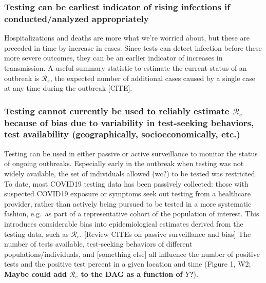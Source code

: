 \documentclass[]{article}
\begin{document}
\hypertarget{testing-can-be-earliest-indicator-of-rising-infections-if-conductedanalyzed-appropriately}{%
\subsubsection{Testing can be earliest indicator of rising infections if
conducted/analyzed
appropriately}\label{testing-can-be-earliest-indicator-of-rising-infections-if-conductedanalyzed-appropriately}}

Hospitalizations and deaths are more what we're worried about, but these
are preceded in time by increase in cases. Since tests can detect
infection before these more severe outcomes, they can be an earlier
indicator of increases in transmission. A useful summary statistic to
estimate the current status of an outbreak is \(\mathcal{R}_e\), the
expected number of additional cases caused by a single case at any time
during the outbreak {[}CITE{]}.

\hypertarget{testing-cannot-currently-be-used-to-reliably-estimate-mathcalr_e-because-of-bias-due-to-variability-in-test-seeking-behaviors-test-availability-geographically-socioeconomically-etc.}{%
\subsubsection{\texorpdfstring{Testing cannot currently be used to
reliably estimate \(\mathcal{R}_e\) because of bias due to variability
in test-seeking behaviors, test availability (geographically,
socioeconomically,
etc.)}{Testing cannot currently be used to reliably estimate \textbackslash mathcal\{R\}\_e because of bias due to variability in test-seeking behaviors, test availability (geographically, socioeconomically, etc.)}}\label{testing-cannot-currently-be-used-to-reliably-estimate-mathcalr_e-because-of-bias-due-to-variability-in-test-seeking-behaviors-test-availability-geographically-socioeconomically-etc.}}

Testing can be used in either passive or active surveillance to monitor
the status of ongoing outbreaks. Especially early in the outbreak when
testing was not widely available, the set of individuals allowed (wc?)
to be tested was restricted. To date, most COVID19 testing data has been
passively collected: those with suspected COVID19 exposure or symptoms
seek out testing from a healthcare provider, rather than actively being
pursued to be tested in a more systematic fashion, e.g.~as part of a
representative cohort of the population of interest. This introduces
considerable bias into epidemiological estimates derived from the
testing data, such as \(\mathcal{R}_e\). {[}Review CITEs on passive
surveillance and bias{]} The number of tests available, test-seeking
behaviors of different populations/individuals, and {[}something else{]}
all influence the number of positive tests and the positive test percent
in a given location and time (Figure 1, W2; \textbf{Maybe could add
\(\mathcal{R}_e\) to the DAG as a function of \(Y\)?}).
\end{document}
